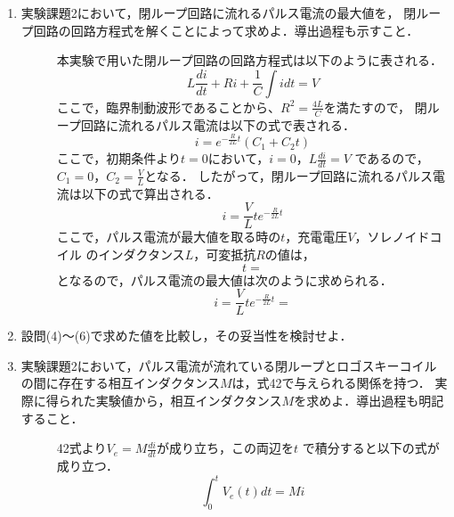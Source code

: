 \begin{enumerate}
    \item 実験課題2において，閉ループ回路に流れるパルス電流の最大値を，
    閉ループ回路の回路方程式を解くことによって求めよ．導出過程も示すこと．
    \begin{description}
        \item[] 本実験で用いた閉ループ回路の回路方程式は以下のように表される．
        $$
        L\frac{di}{dt}+Ri+\frac{1}{C}\int idt=V
        $$
        ここで，臨界制動波形であることから、$R^2=\frac{4L}{C}$を満たすので，
        閉ループ回路に流れるパルス電流は以下の式で表される．
        $$
        i=e^{-\frac{R}{2L}t}(C_1+C_2t)
        $$
        ここで，初期条件より$t=0$において，$i=0$，$L\frac{di}{dt}=V$
        であるので，$C_1=0$，$C_2=\frac{V}{L}$となる．
        したがって，閉ループ回路に流れるパルス電流は以下の式で算出される．
        $$
        i=\frac{V}{L}te^{-\frac{R}{2L}t}
        $$
        ここで，パルス電流が最大値を取る時の$t$，充電電圧$V$，ソレノイドコイル
        のインダクタンス$L$，可変抵抗$R$の値は，
        $$
        t=
        $$
        となるので，パルス電流の最大値は次のように求められる．
        $$
        i=\frac{V}{L}te^{-\frac{R}{2L}t}=
        $$
    \end{description}
    
    \item 設問(4)～(6)で求めた値を比較し，その妥当性を検討せよ．
    \begin{description}
        \item[] 
    \end{description}

    \item 実験課題2において，パルス電流が流れている閉ループとロゴスキーコイル
    の間に存在する相互インダクタンス$M$は，式42で与えられる関係を持つ．
    実際に得られた実験値から，相互インダクタンス$M$を求めよ．導出過程も明記すること．
    \begin{description}
        \item[] 42式より$V_e=M\frac{di}{dt}$が成り立ち，この両辺を$t$
        で積分すると以下の式が成り立つ．
        $$
        \int_{0}^{t}V_e(t)dt=Mi
        $$
    \end{description}
\end{enumerate}
